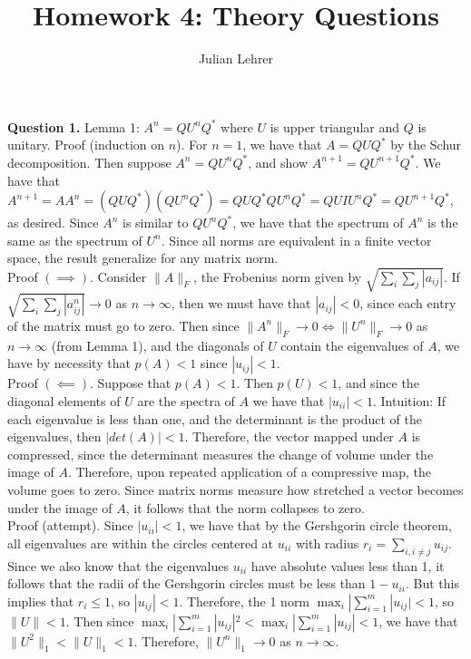 \documentclass{article}
\title{Homework 4: Theory Questions}
\date{}
\author{Julian Lehrer}
\newcommand{\ra}{\longrightarrow}
\begin{document}
\maketitle

\textbf{Question 1.} Lemma 1: $A^n = QU^n Q^*$ where $U$ is upper triangular and $Q$ is unitary. Proof (induction on $n$). For $n=1$, we have that $A = QUQ^*$ by the Schur decomposition. Then suppose $A^n = QU^n Q^*$, and show $A^{n+1}=QU^{n+1}Q^*$. We have that $A^{n+1} = AA^{n} = (Q U Q^*)(QU^n Q^*) = QU Q^* Q U^n Q^* = QUIU^n Q^* = QU^{n+1}Q^*$, as desired. Since $A^n$ is similar to $QU^n Q^*$, we have that the spectrum of $A^n$ is the same as the spectrum of $U^n$. Since all norms are equivalent in a finite vector space, the result generalize for any matrix norm. \\

Proof $(\implies)$. Consider $\|A \|_F$, the Frobenius norm given by $\sqrt{\sum_{i}\sum_{j}|a_{ij}|}$. If $\sqrt{\sum_{i}\sum_j|a^n_{ij}|} \ra 0$ as $n \ra \infty$, then we must have that $|a_{ij}| < 0$, since each entry of the matrix must go to zero. Then since $\|A^n\|_F \ra 0 \iff \|U^n\|_F \ra 0$ as $n \ra \infty$ (from Lemma 1), and the diagonals of $U$ contain the eigenvalues of $A$, we have by necessity that $p(A) < 1$ since $|u_{ij}| < 1$. \\

Proof $(\impliedby)$. Suppose that $p(A) < 1$. Then $p(U) < 1$, and since the diagonal elements of $U$ are the spectra of $A$ we have that $|u_{ii}| < 1$. Intuition: If each eigenvalue is less than one, and the determinant is the product of the eigenvalues, then $|det(A)| < 1$. Therefore, the vector mapped under $A$ is compressed, since the determinant measures the change of volume under the image of $A$. Therefore, upon repeated application of a compressive map, the volume goes to zero. Since matrix norms measure how stretched a vector becomes under the image of $A$, it follows that the norm collapses to zero. \\ 

Proof (attempt). Since $|u_{ii}| < 1$, we have that by the Gershgorin circle theorem, all eigenvalues are within the circles centered at $u_{ii}$ with radius $r_i = \sum_{i, i \neq j} u_{ij}$. Since we also know that the eigenvalues $u_{ii}$ have absolute values less than 1, it follows that the radii of the Gershgorin circles must be less than $1-u_{ii}$. But this implies that $r_i \leq 1$, so $|u_{ij}| < 1$. Therefore, the 1 norm $\max_{i} |\sum_{i=1}^m |u_{ij}| < 1$, so $\|U\| < 1$. Then since $\max_{i} |\sum_{i=1}^m |u_{ij}|^2 < \max_{i} |\sum_{i=1}^m |u_{ij}| < 1$, we have that $\|U^2\|_1 < \|U\|_1 < 1$. Therefore, $\|U^n\|_1 \ra 0$ as $n \ra \infty$. \\
\end{document}
